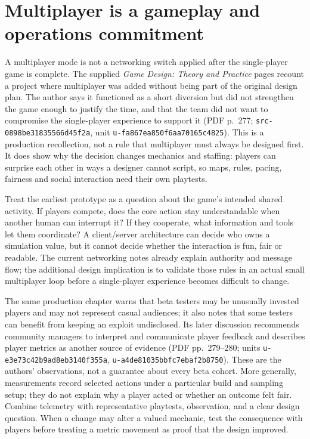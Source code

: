 \section{Multiplayer is a gameplay and operations commitment}\label{06-engine-ii-ch047-multiplayer-is-a-gameplay-and-operations-commitment}

A multiplayer mode is not a networking switch applied after the single-player game is complete. The supplied \emph{Game Design: Theory and Practice} pages recount a project where multiplayer was added without being part of the original design plan. The author says it functioned as a short diversion but did not strengthen the game enough to justify the time, and that the team did not want to compromise the single-player experience to support it (PDF p.~277; \texttt{src-0898be31835566d45f2a}, unit \texttt{u-fa867ea850f6aa70165c4825}). This is a production recollection, not a rule that multiplayer must always be designed first. It does show why the decision changes mechanics and staffing: players can surprise each other in ways a designer cannot script, so maps, rules, pacing, fairness and social interaction need their own playtests.

Treat the earliest prototype as a question about the game's intended shared activity. If players compete, does the core action stay understandable when another human can interrupt it? If they cooperate, what information and tools let them coordinate? A client/server architecture can decide who owns a simulation value, but it cannot decide whether the interaction is fun, fair or readable. The current networking notes already explain authority and message flow; the additional design implication is to validate those rules in an actual small multiplayer loop before a single-player experience becomes difficult to change.

The same production chapter warns that beta testers may be unusually invested players and may not represent casual audiences; it also notes that some testers can benefit from keeping an exploit undisclosed. Its later discussion recommends community managers to interpret and communicate player feedback and describes player metrics as another source of evidence (PDF pp.~279--280; units \texttt{u-e3e73c42b9ad8eb3140f355a}, \texttt{u-a4de81035bbfc7ebaf2b8750}). These are the authors' observations, not a guarantee about every beta cohort. More generally, measurements record selected actions under a particular build and sampling setup; they do not explain why a player acted or whether an outcome felt fair. Combine telemetry with representative playtests, observation, and a clear design question. When a change may alter a valued mechanic, test the consequence with players before treating a metric movement as proof that the design improved.

